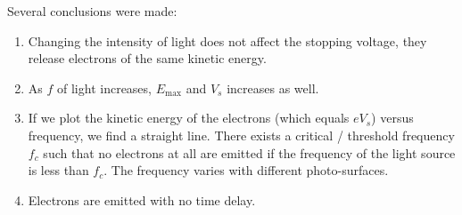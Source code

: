 Several conclusions were made:
\begin{enumerate}
  \item Changing the intensity of light does not affect the stopping voltage, they release electrons of the same kinetic energy.
  \item As $f$ of light increases, $E_\text{max}$ and $V_s$ increases as well.
  \item If we plot the kinetic energy of the electrons (which equals $eV_s$) versus frequency, we find a straight line. There exists a critical / threshold frequency $f_c$ such that no electrons at all are emitted if the frequency of the light source is less than $f_c$. The frequency varies with different photo-surfaces.
  \item Electrons are emitted with no time delay.
\end{enumerate}
